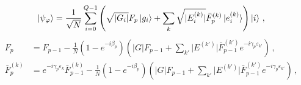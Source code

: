\begin{equation}
    \ket{\psi_{\varphi}} = \frac{1}{\sqrt{ N }} \sum_{i=0}^{Q-1} \left( \sqrt{ \lvert G_{i} \rvert } F_{p} \ket{g_{i}} + \sum_{k} \sqrt{ \lvert E^{(k)}_{i} \rvert } \bar{F}^{(k)}_{p} \ket{e^{(k)}_{i}} \right) \ket{i} \,,
\end{equation}
\begin{align}
    F_{p} &= F_{p-1} - \frac{1}{N} (1-e^{-i\beta_{p}}) \left( \lvert G \rvert   F_{p-1} + \sum_{k'} \lvert E^{(k')} \rvert \bar{F}^{(k')}_{p-1} e^{-i\gamma_{p}\varepsilon_{k'}} \right) \,, \\
    \bar{F}^{(k)}_{p} &= e^{-i\gamma_{p} \varepsilon_{k}}\bar{F}_{p-1}^{(k)} - \frac{1}{N} (1-e^{-i\beta_{p}}) \left( \lvert G \rvert   F_{p-1} + \sum_{k'} \lvert E^{(k')} \rvert \bar{F}^{(k')}_{p-1} e^{-i\gamma_{p}\varepsilon_{k'}} \right) \,,
\end{align}

